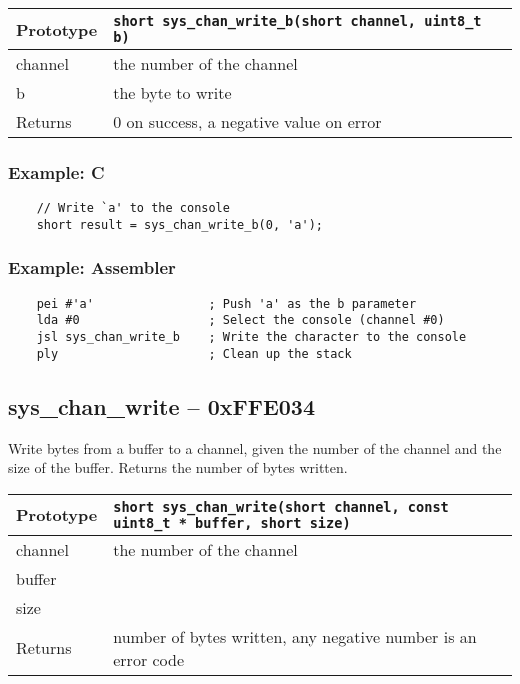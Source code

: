 \bigskip

\begin{tabular}{|l||l|} \hline
Prototype & \lstinline!short sys_chan_write_b(short channel, uint8_t b)! \\ \hline
channel & the number of the channel \\ \hline
b & the byte to write \\ \hline
Returns & 0 on success, a negative value on error \\ \hline
\end{tabular}

\subsubsection*{Example: C}
\begin{lstlisting}
    // Write `a' to the console
    short result = sys_chan_write_b(0, 'a');
\end{lstlisting}

\subsubsection*{Example: Assembler}
\begin{verbatim}
    pei #'a'                ; Push 'a' as the b parameter
    lda #0                  ; Select the console (channel #0)
    jsl sys_chan_write_b    ; Write the character to the console
    ply                     ; Clean up the stack
\end{verbatim}

\subsection*{sys\_chan\_write -- 0xFFE034}
Write bytes from a buffer to a channel, given the number of the channel and the size of the buffer. Returns the number of bytes written.

\bigskip

\begin{tabular}{|l||l|} \hline
Prototype & \lstinline!short sys_chan_write(short channel, const uint8_t * buffer, short size)! \\ \hline
channel & the number of the channel \\ \hline
buffer &  \\ \hline
size &  \\ \hline
Returns & number of bytes written, any negative number is an error code \\ \hline
\end{tabular}

